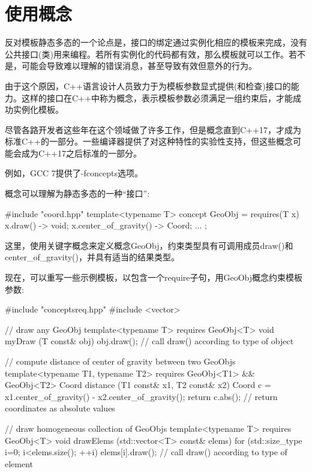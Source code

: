 \section{使用概念}
反对模板静态多态的一个论点是，接口的绑定通过实例化相应的模板来完成，没有公共接口(类)用来编程。若所有实例化的代码都有效，那么模板就可以工作。若不是，可能会导致难以理解的错误消息，甚至导致有效但意外的行为。

由于这个原因，C++语言设计人员致力于为模板参数显式提供(和检查)接口的能力。这样的接口在C++中称为概念，表示模板参数必须满足一组约束后，才能成功实例化模板。

尽管各路开发者这些年在这个领域做了许多工作，但是概念直到C++17，才成为标准C++的一部分。一些编译器提供了对这种特性的实验性支持，但这些概念可能会成为C++17之后标准的一部分。

\begin{notice}
例如，GCC 7提供了-fconcepts选项。
\end{notice}

概念可以理解为静态多态的一种“接口”:

\begin{cpp}
#include "coord.hpp"
template<typename T>
concept GeoObj = requires(T x) {
	{ x.draw() } -> void;
	{ x.center_of_gravity() } -> Coord;
	...
};
\end{cpp}

这里，使用关键字概念来定义概念GeoObj，约束类型具有可调用成员draw()和center\_of\_gravity()，并具有适当的结果类型。

现在，可以重写一些示例模板，以包含一个require子句，用GeoObj概念约束模板参数:

\begin{cpp}
#include "conceptsreq.hpp"
#include <vector>

// draw any GeoObj
template<typename T>
requires GeoObj<T>
void myDraw (T const& obj)
{
	obj.draw(); // call draw() according to type of object
}

// compute distance of center of gravity between two GeoObjs
template<typename T1, typename T2>
requires GeoObj<T1> && GeoObj<T2>
Coord distance (T1 const& x1, T2 const& x2)
{
	Coord c = x1.center_of_gravity() - x2.center_of_gravity();
	return c.abs(); // return coordinates as absolute values
}

// draw homogeneous collection of GeoObjs
template<typename T>
requires GeoObj<T>
void drawElems (std::vector<T> const& elems)
{
	for (std::size_type i=0; i<elems.size(); ++i) {
		elems[i].draw(); // call draw() according to type of element
	}
}
\end{cpp}

